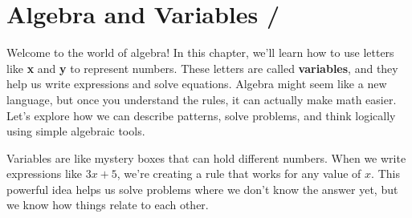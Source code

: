 \newpage
\chapter{Algebra and Variables / }

Welcome to the world of algebra! In this chapter, we'll learn how to use 
letters like \textbf{x} and \textbf{y} to represent numbers. These letters 
are called \textbf{variables}, and they help us write expressions and 
solve equations. Algebra might seem like a new language, but once you 
understand the rules, it can actually make math easier. Let's explore 
how we can describe patterns, solve problems, and think logically 
using simple algebraic tools.

Variables are like mystery boxes that can hold different numbers. When 
we write expressions like \(3x + 5\), we're creating a rule that works 
for any value of \(x\). This powerful idea helps us solve problems 
where we don't know the answer yet, but we know how things relate to 
each other.


% 
% 
% 
% 
% 
% 